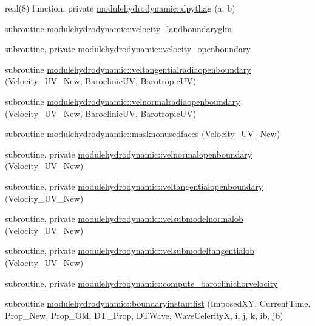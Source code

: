 \begin{DoxyCompactItemize}
real(8) function, private \mbox{\hyperlink{namespacemodulehydrodynamic_a0f02ba5b0cd9a0eb64c1d50570398e36}{modulehydrodynamic\+::dpythag}} (a, b)
\item 
subroutine \mbox{\hyperlink{namespacemodulehydrodynamic_a678adb3cd056a0f44a4c7ba6b7ba8544}{modulehydrodynamic\+::velocity\+\_\+landboundaryglm}}
\item 
subroutine, private \mbox{\hyperlink{namespacemodulehydrodynamic_ad3f40e56e615a729156e48c10775bde3}{modulehydrodynamic\+::velocity\+\_\+openboundary}}
\item 
subroutine \mbox{\hyperlink{namespacemodulehydrodynamic_a52c5b67b475eb26914ed1a1975345d69}{modulehydrodynamic\+::veltangentialradiaopenboundary}} (Velocity\+\_\+\+U\+V\+\_\+\+New, Baroclinic\+UV, Barotropic\+UV)
\item 
subroutine \mbox{\hyperlink{namespacemodulehydrodynamic_a2ee641749eb16598ae6dfe7afd0e53ef}{modulehydrodynamic\+::velnormalradiaopenboundary}} (Velocity\+\_\+\+U\+V\+\_\+\+New, Baroclinic\+UV, Barotropic\+UV)
\item 
subroutine \mbox{\hyperlink{namespacemodulehydrodynamic_ab4a3acec600d04e2afbf5acc7f68b642}{modulehydrodynamic\+::masknonusedfaces}} (Velocity\+\_\+\+U\+V\+\_\+\+New)
\item 
subroutine, private \mbox{\hyperlink{namespacemodulehydrodynamic_af23df453cb52dbe604e896aba3b572aa}{modulehydrodynamic\+::velnormalopenboundary}} (Velocity\+\_\+\+U\+V\+\_\+\+New)
\item 
subroutine, private \mbox{\hyperlink{namespacemodulehydrodynamic_a0be051dfb2855eb7014145fceaa64075}{modulehydrodynamic\+::veltangentialopenboundary}} (Velocity\+\_\+\+U\+V\+\_\+\+New)
\item 
subroutine, private \mbox{\hyperlink{namespacemodulehydrodynamic_aca265830a6a43d55606480ef5abdb2af}{modulehydrodynamic\+::velsubmodelnormalob}} (Velocity\+\_\+\+U\+V\+\_\+\+New)
\item 
subroutine, private \mbox{\hyperlink{namespacemodulehydrodynamic_ac476fd6c2f59116c8cbcbed954fdbc5f}{modulehydrodynamic\+::velsubmodeltangentialob}} (Velocity\+\_\+\+U\+V\+\_\+\+New)
\item 
subroutine, private \mbox{\hyperlink{namespacemodulehydrodynamic_a5548f1e73131ae2e60c1386848706e83}{modulehydrodynamic\+::compute\+\_\+baroclinichorvelocity}}
\item 
subroutine \mbox{\hyperlink{namespacemodulehydrodynamic_a1e87e450d8be8b7bee682d2ef22558f8}{modulehydrodynamic\+::boundaryinstantlist}} (Imposed\+XY, Current\+Time, Prop\+\_\+\+New, Prop\+\_\+\+Old, D\+T\+\_\+\+Prop, D\+T\+Wave, Wave\+CelerityX, i, j, k, ib, jb)

\end{DoxyCompactItemize}
